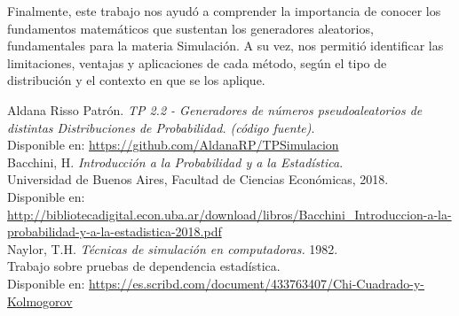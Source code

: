 \documentclass{article}
\begin{document}
Finalmente, este trabajo nos ayudó a comprender la importancia de conocer los fundamentos matemáticos que sustentan los generadores aleatorios, fundamentales para la materia Simulación. A su vez, nos permitió identificar las limitaciones, ventajas y aplicaciones de cada método, según el tipo de distribución y el contexto en que se los aplique.

  
\begin{thebibliography}{2}

Aldana Risso Patrón. \textit{TP 2.2 - Generadores de números pseudoaleatorios de distintas Distribuciones de Probabilidad. (código fuente)}.\\
Disponible en: \url{https://github.com/AldanaRP/TPSimulacion} \\

Bacchini, H. \textit{Introducción a la Probabilidad y a la Estadística}.\\
Universidad de Buenos Aires, Facultad de Ciencias Económicas, 2018.\\
Disponible en: \url{http://bibliotecadigital.econ.uba.ar/download/libros/Bacchini_Introduccion-a-la-probabilidad-y-a-la-estadistica-2018.pdf}\\

Naylor, T.H. \textit{Técnicas de simulación en computadoras. }1982. \\

Trabajo sobre pruebas de dependencia estadística. \\
Disponible en:
\url{https://es.scribd.com/document/433763407/Chi-Cuadrado-y-Kolmogorov}

\end{thebibliography}
\end{document}
